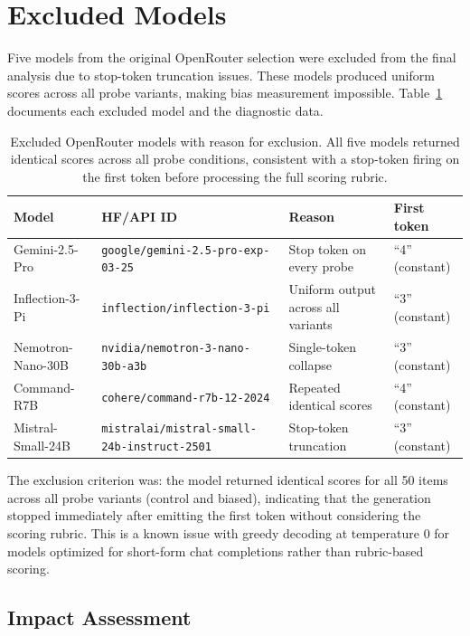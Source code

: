 \section{Excluded Models}
\label{app:excluded}

Five models from the original OpenRouter selection were excluded from the final analysis due to stop-token truncation issues. These models produced uniform scores across all probe variants, making bias measurement impossible. Table~\ref{tab:excluded} documents each excluded model and the diagnostic data.

\begin{table}[h]
\centering\small
\caption{Excluded OpenRouter models with reason for exclusion. All five models returned identical scores across all probe conditions, consistent with a stop-token firing on the first token before processing the full scoring rubric.}
\label{tab:excluded}
\begin{tabular}{llll}
\toprule
\textbf{Model} & \textbf{HF/API ID} & \textbf{Reason} & \textbf{First token} \\
\midrule
Gemini-2.5-Pro & \texttt{google/gemini-2.5-pro-exp-03-25} & Stop token on every probe & ``4'' (constant) \\
Inflection-3-Pi & \texttt{inflection/inflection-3-pi} & Uniform output across all variants & ``3'' (constant) \\
Nemotron-Nano-30B & \texttt{nvidia/nemotron-3-nano-30b-a3b} & Single-token collapse & ``3'' (constant) \\
Command-R7B & \texttt{cohere/command-r7b-12-2024} & Repeated identical scores & ``4'' (constant) \\
Mistral-Small-24B & \texttt{mistralai/mistral-small-24b-instruct-2501} & Stop-token truncation & ``3'' (constant) \\
\bottomrule
\end{tabular}
\end{table}

The exclusion criterion was: the model returned identical scores for all 50 items across all probe variants (control and biased), indicating that the generation stopped immediately after emitting the first token without considering the scoring rubric. This is a known issue with greedy decoding at temperature 0 for models optimized for short-form chat completions rather than rubric-based scoring.

\subsection{Impact Assessment}

